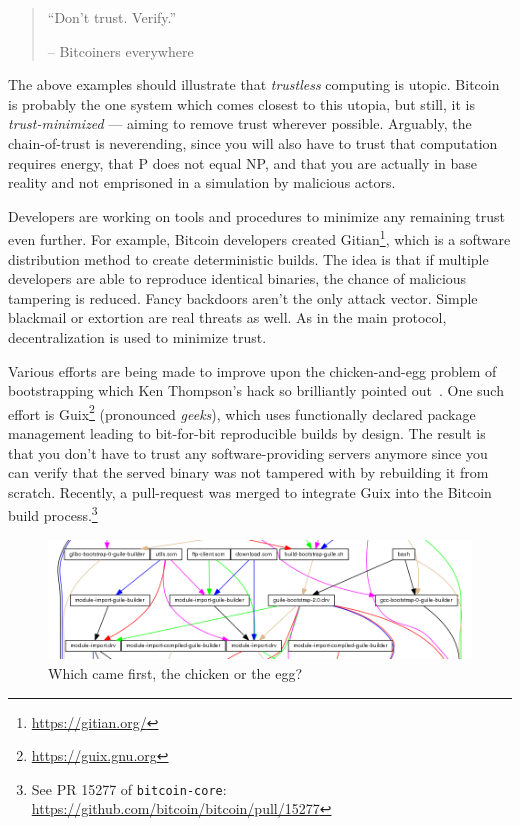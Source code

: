 \begin{quotation}\begin{samepage}
\enquote{Don't trust. Verify.}
\begin{flushright} -- Bitcoiners everywhere
\end{flushright}\end{samepage}\end{quotation}

The above examples should illustrate that \textit{trustless} computing is
utopic. Bitcoin is probably the one system which comes closest to this
utopia, but still, it is \textit{trust-minimized} --- aiming to remove trust
wherever possible. Arguably, the chain-of-trust is neverending, since
you will also have to trust that computation requires energy, that P
does not equal NP, and that you are actually in base reality and not
emprisoned in a simulation by malicious actors.

Developers are working on tools and procedures to minimize any remaining trust
even further. For example, Bitcoin developers created
Gitian\footnote{\url{https://gitian.org/}}, which is a software distribution
method to create deterministic builds. The idea is that if multiple developers
are able to reproduce identical binaries, the chance of malicious tampering is
reduced. Fancy backdoors aren't the only attack vector. Simple blackmail or
extortion are real threats as well. As in the main protocol, decentralization is
used to minimize trust.

Various efforts are being made to improve upon the chicken-and-egg problem of
bootstrapping which Ken Thompson's hack so brilliantly pointed
out~\cite{web:bootstrapping}. One such effort is
Guix\footnote{\url{https://guix.gnu.org}} (pronounced \textit{geeks}), which
uses functionally declared package management leading to bit-for-bit
reproducible builds by design. The result is that you don't have to trust any
software-providing servers anymore since you can verify that the served binary
was not tampered with by rebuilding it from scratch. Recently, a
pull-request was merged to integrate Guix into the Bitcoin build process.\footnote{See PR 15277 of \texttt{bitcoin-core}: \\ \url{https://github.com/bitcoin/bitcoin/pull/15277}}

\begin{figure}
  \includegraphics{assets/images/guix-bootstrap-dependencies.png}
  \caption{Which came first, the chicken or the egg?}
  \label{fig:guix-bootstrap-dependencies}
\end{figure}

